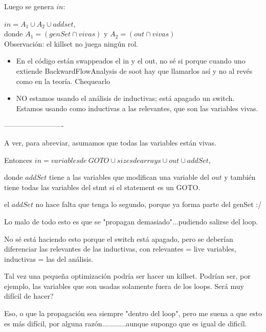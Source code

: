 \documentclass[10pt,a4paper,final]{report}
\begin{document}

Luego se genera $in$:

$in = A_1 \cup A_2 \cup addset$,\\

donde $A_1 = (genSet \cap vivas)$ y $A_2 = (out \cap vivas)$\\

Observación: el killset no juega ningún rol.\\


\begin{itemize}
	\item En el código están swappeados el in y el out, no sé si porque cuando uno extiende BackwardFlowAnalysis de soot hay que llamarlos así y no al revés como en la teoría. Chequearlo
	\item NO estamos usando el análisis de inductivas; está apagado un switch. Estamos usando como inductivas a las relevantes, que son las variables vivas.
\end{itemize}

-------------------------

A ver, para abreviar, asumamos que todas las variables están vivas.

Entonces $in = variables de\ GOTO \cup sizes de arrays \cup out \cup addSet$,

donde $addSet$ tiene a las variables que modifican una variable del $out$ y también tiene todas las variables del stmt si el statement es un GOTO.

el $addSet$ no hace falta que tenga lo segundo, porque ya forma parte del genSet :/

Lo malo de todo esto es que se "propagan demasiado"...pudiendo salirse del loop.

No sé está haciendo esto porque el switch está apagado, pero se deberían diferenciar las relevantes de las inductivas, con relevantes = live variables, inductivas = las del análisis.


Tal vez una pequeña optimización podría ser hacer un killset. Podrían ser, por ejemplo, las variables que son usadas solamente fuera de los loops. Será muy difícil de hacer?

Eso, o que la propagación sea siempre "dentro del loop", pero me suena a que esto es más difícil, por alguna razón............aunque supongo que es igual de dificíl.
\end{document}
